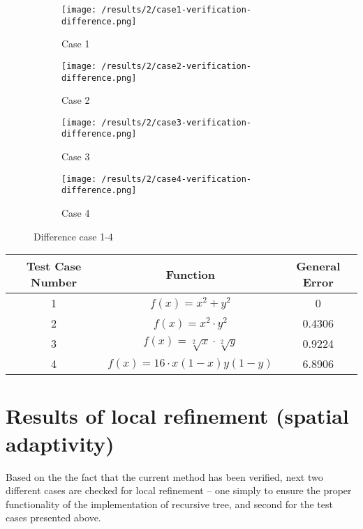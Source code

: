 \begin{figure}[h!]
	\centering
    \begin{subfigure}[b]{0.49\textwidth}
	    \texttt{[image: /results/2/case1-verification-difference.png]}
		\centering
        \label{fig:results2case1Diff}
        \caption{Case 1}
    \end{subfigure} 
    \begin{subfigure}[b]{0.49\textwidth}    
	    \texttt{[image: /results/2/case2-verification-difference.png]}
		\centering    
	 \caption{Case 2}
	    \label{fig:results2case2Diff}	 	 
    \end{subfigure} 
    \begin{subfigure}[b]{0.49\textwidth}
	    \texttt{[image: /results/2/case3-verification-difference.png]}
		\centering
        \label{fig:results2case3Diff}
        \caption{Case 3}
    \end{subfigure} 
    \begin{subfigure}[b]{0.49\textwidth}    
	    \texttt{[image: /results/2/case4-verification-difference.png]}
		\centering    
	 \caption{Case 4}
	    \label{fig:results2case4Diff}	 	 
    \end{subfigure} 
    \caption{Difference case 1-4}
    \label{fig:results2case1-4Diff}
\end{figure}

\begin{center}
 \begin{tabular}{| c | c | c |}
\hline
 Test Case Number & Function &  General Error\\
 \hline
 1 & $f(x)=x^2+y^2$ & 0 \\
 \hline
 2 & $f(x)=x^2 \cdot y^2 $ & 0.4306\\
 \hline
 3 & $f(x)=\sqrt[2]{x} \cdot \sqrt[2]{y}$ & 0.9224\\
 \hline
 4 & $f(x)=16 \cdot x(1-x)y(1-y)$ & 6.8906 \\
 \hline
 \end{tabular}
\end{center}

\section{Results of local refinement (spatial adaptivity)}
Based on the the fact that the current method has been verified, next two different cases are checked for local refinement -- one simply to ensure the proper functionality of the implementation of recursive tree,  and second for the test cases presented above. 

